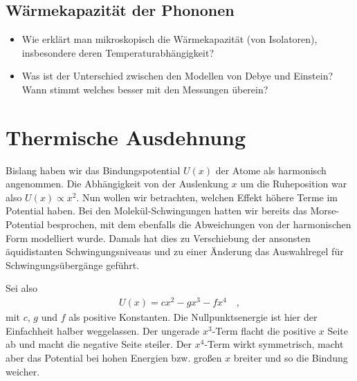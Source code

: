 \subsection*{Wärmekapazität der Phononen}

\begin{itemize}\setlength{\itemsep}{0pt}
    \item Wie erklärt man mikroskopisch die Wärmekapazität (von Isolatoren), insbesondere deren Temperaturabhängigkeit?
    \item Was ist der Unterschied zwischen den Modellen von Debye und Einstein? Wann stimmt welches besser mit den Messungen überein? 
\end{itemize}






\section{Thermische Ausdehnung}

Bislang haben wir das Bindungspotential $U(x)$ der Atome als harmonisch angenommen. Die Abhängigkeit von der Auslenkung $x$ um die Ruheposition war also $U(x) \propto x^2$. Nun wollen wir betrachten, welchen Effekt höhere Terme im Potential haben. Bei den Molekül-Schwingungen hatten wir bereits das Morse-Potential besprochen, mit dem ebenfalls die Abweichungen von der harmonischen Form modelliert wurde. Damals hat dies zu Verschiebung der ansonsten äquidistanten Schwingungsniveaus und zu einer Änderung das Auswahlregel für Schwingungsübergänge geführt.

Sei also 
\begin{eqnarray}
    U(x) = c x^2 - g x^3 - f x^4 \quad ,
\end{eqnarray}
mit $c$, $g$ und $f$ als positive Konstanten. Die Nullpunktsenergie ist hier der Einfachheit halber weggelassen. Der ungerade $x^3$-Term flacht die positive $x$ Seite ab und macht die negative Seite steiler. Der $x^4$-Term wirkt symmetrisch, macht aber das Potential bei hohen Energien bzw. großen $x$  breiter und so die Bindung weicher.

